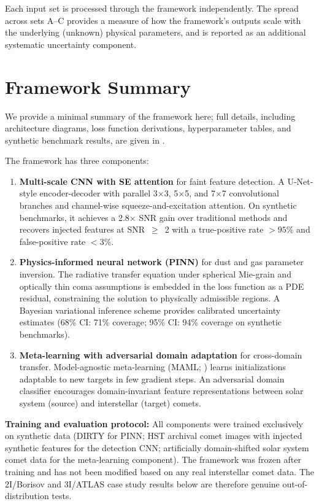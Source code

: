 \documentclass[usenatbib]{mnras}
\begin{document}
Each input set is processed through the framework independently. The spread across sets A--C provides a measure of how the framework's outputs scale with the underlying (unknown) physical parameters, and is reported as an additional systematic uncertainty component.

\section{Framework Summary}\label{sec:methods}

We provide a minimal summary of the framework here; full details, including architecture diagrams, loss function derivations, hyperparameter tables, and synthetic benchmark results, are given in \citet{paperI}.

The framework has three components:

\begin{enumerate}
    \item \textbf{Multi-scale CNN with SE attention} for faint feature detection. A U-Net-style encoder-decoder with parallel 3$\times$3, 5$\times$5, and 7$\times$7 convolutional branches and channel-wise squeeze-and-excitation attention. On synthetic benchmarks, it achieves a 2.8$\times$ SNR gain over traditional methods and recovers injected features at SNR~$\geq$~2 with a true-positive rate $>95\%$ and false-positive rate $<3\%$.
    \item \textbf{Physics-informed neural network (PINN)} for dust and gas parameter inversion. The radiative transfer equation under spherical Mie-grain and optically thin coma assumptions is embedded in the loss function as a PDE residual, constraining the solution to physically admissible regions. A Bayesian variational inference scheme provides calibrated uncertainty estimates (68\% CI: 71\% coverage; 95\% CI: 94\% coverage on synthetic benchmarks).
    \item \textbf{Meta-learning with adversarial domain adaptation} for cross-domain transfer. Model-agnostic meta-learning (MAML; \citealt{finn17}) learns initializations adaptable to new targets in few gradient steps. An adversarial domain classifier \citep{ganin16} encourages domain-invariant feature representations between solar system (source) and interstellar (target) comets.
\end{enumerate}

\textbf{Training and evaluation protocol:} All components were trained exclusively on synthetic data (DIRTY for PINN; HST archival comet images with injected synthetic features for the detection CNN; artificially domain-shifted solar system comet data for the meta-learning component). The framework was frozen after training and has not been modified based on any real interstellar comet data. The 2I/Borisov and 3I/ATLAS case study results below are therefore genuine out-of-distribution tests.
\end{document}
